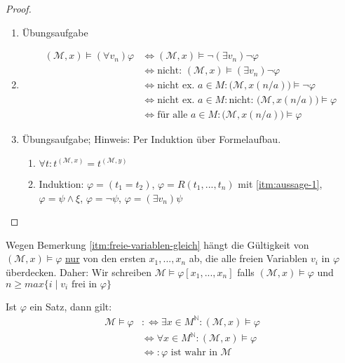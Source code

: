 \documentclass{article}
\theoremstyle{definition}
\theoremstyle{plain}
\newcommand{\m}[1]{\mathcal{#1}}
\begin{document}
    \begin{proof}
        ~\par
        \begin{enumerate}
            \item Übungsaufgabe
            \item \begin{align*}
                (\m{M}, x) \models (\forall v_n) \varphi & \Leftrightarrow (\m{M}, x) \models \neg (\exists v_n) \neg \varphi \\
                & \Leftrightarrow \text{nicht: } (\m{M}, x) \models (\exists v_n) \neg \varphi \\
                & \Leftrightarrow \text{nicht ex. } a \in M: \big(\m{M}, x(n/a)\big) \models \neg \varphi \\
                & \Leftrightarrow \text{nicht ex. } a \in M: \text{nicht: } \big(\m{M}, x(n/a)\big) \models \varphi \\
                & \Leftrightarrow \text{für alle } a \in M: \big(\m{M}, x(n/a)\big) \models \varphi
            \end{align*}
            \item Übungsaufgabe; Hinweis: Per Induktion über Formelaufbau.
            \begin{enumerate}
                \item $ \forall t: t^{(\m{M}, x)} = t^{(\m{M}, y)} $ \label{itm:aussage-1}
                \item Induktion: $ \varphi = (t_1 = t_2) $, $ \varphi = R(t_1, ..., t_n) $ mit \ref{itm:aussage-1}, $ \varphi = \psi \land \xi $, $ \varphi = \neg \psi $, $ \varphi = (\exists v_n) \psi $
            \end{enumerate}
        \end{enumerate}
    \end{proof}

    Wegen Bemerkung \ref{itm:freie-variablen-gleich} hängt die Gültigkeit von $ (\m{M}, x) \models \varphi $ \underline{nur} von den ersten $ x_1, ..., x_n $ ab, die alle freien Variablen $ v_i $ in $ \varphi $ überdecken.
    Daher: Wir schreiben $ \m{M} \models \varphi[x_1, ..., x_n] $ falls $ (\m{M}, x) \models \varphi $ und $ n \geq max\{i \mid v_i \text{ frei in } \varphi\} $

    Ist $ \varphi $ ein Satz, dann gilt:
    \begin{align*}
        \m{M} \models \varphi & :\Leftrightarrow \exists x \in M^{\mathbb{N}}: (\m{M}, x) \models \varphi \\
        & \Leftrightarrow \forall x \in M^\mathbb{N}: (\m{M}, x) \models \varphi \\
        & \Leftrightarrow: \varphi \text{ ist wahr in } \m{M}
    \end{align*}
\end{document}
